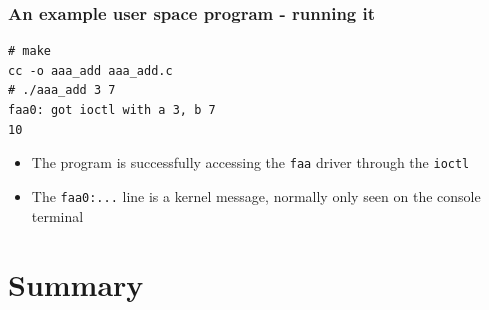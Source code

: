 \documentclass[dvipsnames,table]{beamer}
\begin{document}
\begin{frame}[fragile]
\frametitle{An example user space program - running it}
\begin{verbatim}
# make
cc -o aaa_add aaa_add.c
# ./aaa_add 3 7
faa0: got ioctl with a 3, b 7
10
\end{verbatim}
\begin{itemize}
	\item The program is successfully accessing the {\tt faa} driver through the {\tt ioctl}	
	\item The {\tt faa0:...} line is a kernel message, normally only seen on the console terminal
\end{itemize}
\end{frame}


\section{Summary}
\end{document}
